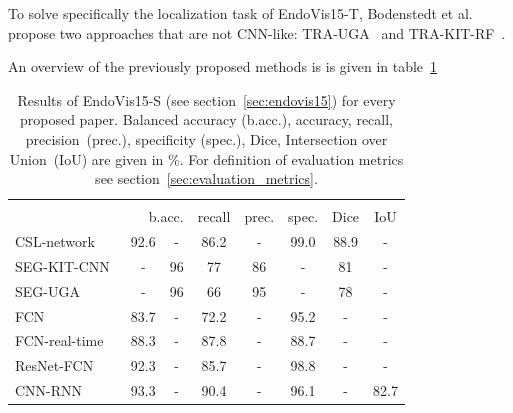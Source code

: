 To solve specifically the localization task of EndoVis15-T, Bodenstedt et al.~\cite{miccai15_results2018bodenstedt} propose two approaches that are not CNN-like: TRA-UGA~\cite{SEG-UGA2016agustinos} and TRA-KIT-RF~\cite{KIT-TRA2016bodenstedt}.

An overview of the previously proposed methods is is given in table~\ref{tab:summary_results_endovis15}

\begin{table}
\centering
\begin{tabular}{l c c c c c c c}
\hline\noalign{\smallskip} 
\multicolumn{8}{c}{\textbf{EndoVis15-S results}} \\
 & \multicolumn{2}{r}{b.acc.} accuracy & recall & prec. & spec. & Dice & IoU \\ \hline 
CSL-network~\cite{Laina2017} & 92.6 & - & 86.2 & - & 99.0 &  88.9 & - \\
SEG-KIT-CNN~\cite{KIT-TRA2016bodenstedt} & - &  96 & 77 & 86 & - & 81 & - \\
SEG-UGA~\cite{SEG-UGA2016agustinos} & - & 96 & 66 & 95 & - & 78 & - \\
FCN~\cite{garcia2017segm_nonrigid_book} & 83.7 & - & 72.2 & - & 95.2 & - & - \\
FCN-real-time~\cite{garcia2017segm_nonrigid_book} & 88.3 & - & 87.8 & - & 88.7 & - & - \\
ResNet-FCN~\cite{deep_residual_instr_segm2017pakhmov} & 92.3 & - & 85.7 & - & 98.8 & - & - \\
CNN-RNN~\cite{Attia2017_surg_tool_cnn-rnn} & 93.3 & - & 90.4 & - & 96.1 & - & 82.7 \\
\hline 
\end{tabular}
\caption[Results EndoVis15-S, State of the Art]{Results of EndoVis15-S (see section~\ref{sec:endovis15}) for every proposed paper. Balanced accuracy (b.acc.), accuracy, recall, precision~(prec.), specificity (spec.), Dice, Intersection over Union~(IoU) are given in \%. For definition of evaluation metrics see section~\ref{sec:evaluation_metrics}.}
\label{tab:summary_results_endovis15}
\end{table}


